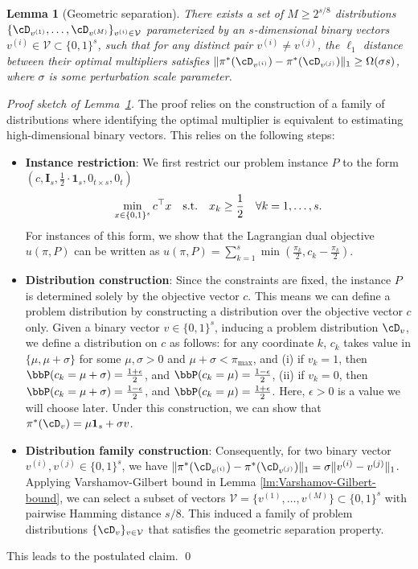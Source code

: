 \documentclass{article}
\theoremstyle{plain}
\newtheorem{lemma}[theorem]{Lemma}
\theoremstyle{definition}
\theoremstyle{remark}
\begin{document}
\begin{lemma}[Geometric separation] \label{lm:lower-bound-step-1}
    There exists a set of $M \geq 2^{s/8}$ distributions $\{\cD_{v^{(1)}}, \dots, \cD_{v^{(M)}}\}_{v^{(i)} \in \mathcal V}$ parameterized by an $s$-dimensional binary vectors $v^{(i)} \in \mathcal V \subset \{0, 1\}^s$, such that for any distinct pair $v^{(i)} \neq v^{(j)}$, the $\ell_1$ distance between their optimal multipliers satisfies $\|\pi^*(\cD_{v^{(i)}}) - \pi^*(\cD_{v^{(j)}})\|_1 \geq \Omega(\sigma s)$, where $\sigma$ is some perturbation scale parameter.
\end{lemma}
\textit{Proof sketch of Lemma~\ref{lm:lower-bound-step-1}.}  
    The proof relies on the construction of a family of distributions where identifying the optimal multiplier is equivalent to estimating high-dimensional binary vectors. This relies on the following steps:
    \begin{itemize}[leftmargin=*]
        \item \textbf{Instance restriction}: We first restrict our problem instance $P$ to the form $(c, \mathbf{I}_s, \frac{1}{2}\cdot \mathbf{1}_s, 0_{t \times s}, 0_t)$
        \[
            \min_{x \in \{0, 1\}^s} c^\top x \quad \textup{s.t.} \quad x_k \geq \frac{1}{2} \quad \forall k = 1, \dots, s.
        \]
         For instances of this form, we show that the Lagrangian dual objective $u(\pi, P)$ can be written as $u(\pi, P) = \sum_{k = 1}^s\min\left(\frac{\pi_k}{2}, c_k - \frac{\pi_k}{2}\right)$.
         
        \item \textbf{Distribution construction}: Since the constraints are fixed, the instance $P$ is determined solely by the objective vector $c$. This means we can define a problem distribution by constructing a distribution over the objective vector $c$ only. Given a binary vector $v \in \{0, 1\}^s$, inducing a problem distribution $\cD_v$, we define a distribution on $c$ as follows: for any coordinate $k$, $c_k$ takes value in $\{\mu, \mu + \sigma\}$ for some $\mu, \sigma > 0$ and $\mu+\sigma < \pi_{\max}$, and (i) if $v_k = 1$, then $\bbP(c_k = \mu + \sigma) = \frac{1 + \epsilon}{2}$, and $\bbP(c_k = \mu) = \frac{1 - \epsilon}{2}$, (ii) if $v_k = 0$, then $\bbP(c_k = \mu + \sigma) = \frac{1 - \epsilon}{2}$, and $\bbP(c_k = \mu) = \frac{1 + \epsilon}{2}$. Here, $\epsilon > 0$ is a value we will choose later. Under this construction, we can show that $\pi^*(\cD_v) = \mu \mathbf{1}_s + \sigma v$.

        \item \textbf{Distribution family construction}: Consequently, for two binary vector $v^{(i)}, v^{(j)} \in \{0, 1\}^s$, we have $\|\pi^*(\cD_{v^{(i)}}) - \pi^*(\cD_{v^{(j)}})\|_1 = \sigma \|v^{(i)} - v^{(j)}\|_1$. Applying Varshamov-Gilbert bound in Lemma \ref{lm:Varshamov-Gilbert-bound}, we can select a subset of vectors $\mathcal V = \{v^{(1)}, \dots, v^{(M)}\} \subset \{0, 1\}^s$ with pairwise Hamming distance $s/8$. This induced a family of problem distributions $\{\cD_{v}\}_{v \in \mathcal V}$ that satisfies the geometric separation property.
    \end{itemize}
    This leads to the postulated claim.
\qed
\end{document}
